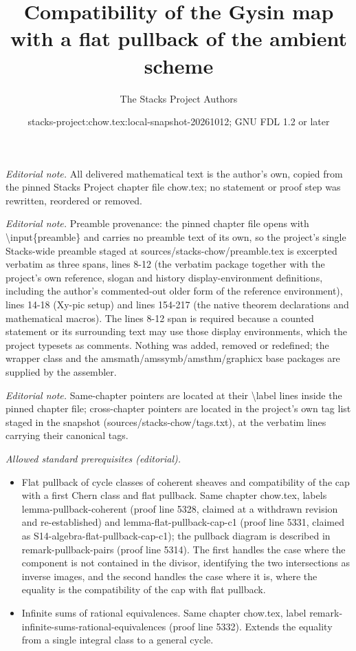 \documentclass[10pt,a4paper]{amsart}
\title{Compatibility of the Gysin map with a flat pullback of the ambient scheme}
\author{The Stacks Project Authors}
\date{stacks-project:chow.tex:local-snapshot-20261012; GNU FDL 1.2 or later}
\theoremstyle{plain}
\theoremstyle{definition}
\theoremstyle{remark}
\numberwithin{equation}{subsection}
\begin{document}
\maketitle
\noindent\textit{Editorial note.} All delivered mathematical text is the author's own, copied from the pinned Stacks Project chapter file chow.tex; no statement or proof step was rewritten, reordered or removed.\par\medskip
\noindent\textit{Editorial note.} Preamble provenance: the pinned chapter file opens with \textbackslash{}input\{preamble\} and carries no preamble text of its own, so the project's single Stacks-wide preamble staged at sources/stacks-chow/preamble.tex is excerpted verbatim as three spans, lines 8-12 (the verbatim package together with the project's own reference, slogan and history display-environment definitions, including the author's commented-out older form of the reference environment), lines 14-18 (Xy-pic setup) and lines 154-217 (the native theorem declarations and mathematical macros). The lines 8-12 span is required because a counted statement or its surrounding text may use those display environments, which the project typesets as comments. Nothing was added, removed or redefined; the wrapper class and the amsmath/amssymb/amsthm/graphicx base packages are supplied by the assembler.\par\medskip
\noindent\textit{Editorial note.} Same-chapter pointers are located at their \textbackslash{}label lines inside the pinned chapter file; cross-chapter pointers are located in the project's own tag list staged in the snapshot (sources/stacks-chow/tags.txt), at the verbatim lines carrying their canonical tags.\par\medskip
\noindent\textit{Allowed standard prerequisites (editorial).}\begin{itemize}
\item Flat pullback of cycle classes of coherent sheaves and compatibility of the cap with a first Chern class and flat pullback. Same chapter chow.tex, labels lemma-pullback-coherent (proof line 5328, claimed at a withdrawn revision and re-established) and lemma-flat-pullback-cap-c1 (proof line 5331, claimed as S14-algebra-flat-pullback-cap-c1); the pullback diagram is described in remark-pullback-pairs (proof line 5314). The first handles the case where the component is not contained in the divisor, identifying the two intersections as inverse images, and the second handles the case where it is, where the equality is the compatibility of the cap with flat pullback.
\item Infinite sums of rational equivalences. Same chapter chow.tex, label remark-infinite-sums-rational-equivalences (proof line 5332). Extends the equality from a single integral class to a general cycle.
\end{itemize}\medskip
\end{document}
